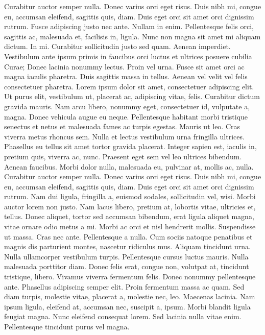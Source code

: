 \documentclass[draft,12pt,twoside,a4paper]{book}
\begin{document}
Curabitur auctor semper nulla.
Donec varius orci eget risus.
Duis nibh mi, congue eu, accumsan eleifend, sagittis quis, diam.
Duis eget orci sit amet orci dignissim rutrum.
Fusce adipiscing justo nec ante.
Nullam in enim.
Pellentesque felis orci, sagittis ac, malesuada et, facilisis in, ligula.
Nunc non magna sit amet mi aliquam dictum.
In mi.
Curabitur sollicitudin justo sed quam.
Aenean imperdiet.
Vestibulum ante ipsum primis in faucibus orci luctus et ultrices
posuere cubilia Curae; Donec lacinia nonummy lectus.
Proin vel urna.
Fusce sit amet orci ac magna iaculis pharetra.
Duis sagittis massa in tellus.
Aenean vel velit vel felis consectetuer pharetra.
Lorem ipsum dolor sit amet, consectetuer adipiscing elit.
Ut purus elit, vestibulum ut, placerat ac, adipiscing vitae, felis.
Curabitur dictum gravida mauris.
Nam arcu libero, nonummy eget, consectetuer id, vulputate a, magna.
Donec vehicula augue eu neque.
Pellentesque habitant morbi tristique senectus et netus et malesuada fames
 ac turpis egestas.
Mauris ut leo.
Cras viverra metus rhoncus sem.
Nulla et lectus vestibulum urna fringilla ultrices.
Phasellus eu tellus sit amet tortor gravida placerat.
Integer sapien est, iaculis in, pretium quis, viverra ac, nunc.
Praesent eget sem vel leo ultrices bibendum.
Aenean faucibus.
Morbi dolor nulla, malesuada eu, pulvinar at, mollis ac, nulla.
Curabitur auctor semper nulla.
Donec varius orci eget risus.
Duis nibh mi, congue eu, accumsan eleifend, sagittis quis, diam.
Duis eget orci sit amet orci dignissim rutrum.
Nam dui ligula, fringilla a, euismod sodales, sollicitudin vel, wisi.
Morbi auctor lorem non justo.
Nam lacus libero, pretium at, lobortis vitae, ultricies et, tellus.
Donec aliquet, tortor sed accumsan bibendum, erat ligula aliquet magna,
 vitae ornare odio metus a mi.
Morbi ac orci et nisl hendrerit mollis.
Suspendisse ut massa.
Cras nec ante.
Pellentesque a nulla.
Cum sociis natoque penatibus et magnis dis parturient montes,
 nascetur ridiculus mus.
Aliquam tincidunt urna.
Nulla ullamcorper vestibulum turpis.
Pellentesque cursus luctus mauris.
Nulla malesuada porttitor diam.
Donec felis erat, congue non, volutpat at, tincidunt tristique, libero.
Vivamus viverra fermentum felis.
Donec nonummy pellentesque ante.
Phasellus adipiscing semper elit.
Proin fermentum massa ac quam.
Sed diam turpis, molestie vitae, placerat a, molestie nec, leo.
Maecenas lacinia.
Nam ipsum ligula, eleifend at, accumsan nec, suscipit a, ipsum.
Morbi blandit ligula feugiat magna.
Nunc eleifend consequat lorem.
Sed lacinia nulla vitae enim.
Pellentesque tincidunt purus vel magna.
\end{document}
